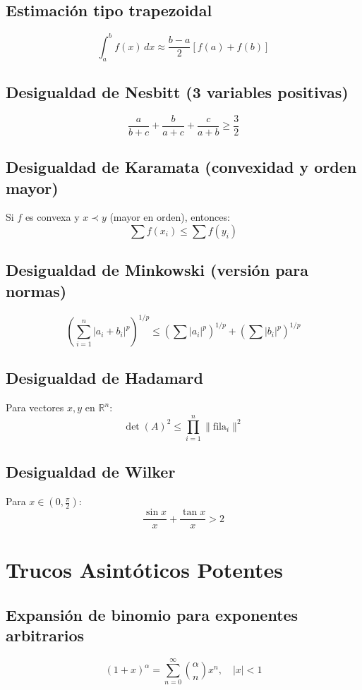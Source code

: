 \documentclass[12pt]{article}
\begin{document}
\subsection{Estimación tipo trapezoidal}
\[
\int_a^b f(x)\,dx \approx \frac{b - a}{2} [f(a) + f(b)]
\]







\newpage


\subsection{Desigualdad de Nesbitt (3 variables positivas)}
\[
\frac{a}{b + c} + \frac{b}{a + c} + \frac{c}{a + b} \geq \frac{3}{2}
\]

\subsection{Desigualdad de Karamata (convexidad y orden mayor)}
Si \(f\) es convexa y \(x \prec y\) (mayor en orden), entonces:
\[
\sum f(x_i) \leq \sum f(y_i)
\]

\subsection{Desigualdad de Minkowski (versión para normas)}
\[
\left( \sum_{i=1}^n |a_i + b_i|^p \right)^{1/p} \leq \left( \sum |a_i|^p \right)^{1/p} + \left( \sum |b_i|^p \right)^{1/p}
\]

\subsection{Desigualdad de Hadamard}
Para vectores \(x, y\) en \(\mathbb{R}^n\):
\[
\det(A)^2 \leq \prod_{i=1}^n \| \text{fila}_i \|^2
\]

\subsection{Desigualdad de Wilker}
Para \(x \in (0, \frac{\pi}{2})\):
\[
\frac{\sin x}{x} + \frac{\tan x}{x} > 2
\]

\section{Trucos Asintóticos Potentes}

\subsection{Expansión de binomio para exponentes arbitrarios}
\[
(1 + x)^\alpha = \sum_{n=0}^\infty \binom{\alpha}{n} x^n,\quad |x| < 1
\]
\end{document}
